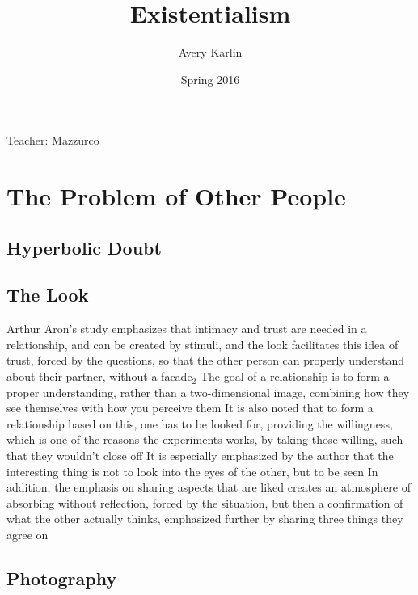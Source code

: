 \documentclass[11 pt, twoside]{article}
\newenvironment{outline*}
{
	\begin{outline}[enumerate]
	}
	{\end{outline}
}
\newcommand{\foota}[1]{\hyperlink{#1}{$_#1$}}
\begin{document}
\title{Existentialism}
\author{Avery Karlin}
\date{Spring 2016}
\newcommand{\teacher}{Mazzurco}

\maketitle
\newpage
\hypertarget{content}{\tableofcontents}
\vspace{11pt}
\noindent
\underline{Teacher}: \teacher
\newpage

\section{The Problem of Other People}
\subsection{Hyperbolic Doubt}
\begin{outline*}
\1
\end{outline*}
\subsection{The Look}
\begin{outline*}
\1 Arthur Aron's study emphasizes that intimacy and trust are needed in a relationship, and can be created by stimuli, and the look facilitates this idea of trust, forced by the questions, so that the other person can properly understand about their partner, without a facade\foota{2}
\2 The goal of a relationship is to form a proper understanding, rather than a two-dimensional image, combining how they see themselves with how you perceive them
\3 It is also noted that to form a relationship based on this, one has to be looked for, providing the willingness, which is one of the reasons the experiments works, by taking those willing, such that they wouldn't close off
\2 It is especially emphasized by the author that the interesting thing is not to look into the eyes of the other, but to be seen
\2 In addition, the emphasis on sharing aspects that are liked creates an atmosphere of absorbing without reflection, forced by the situation, but then a confirmation of what the other actually thinks, emphasized further by sharing three things they agree on
\end{outline*}
\subsection{Photography}
\begin{outline*}
\1
\end{outline*}
\end{document}
